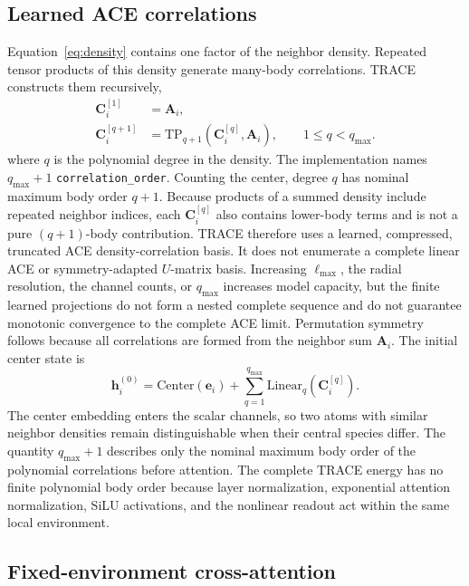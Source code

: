 \documentclass[aps,prx,preprint,notitlepage,superscriptaddress,nofootinbib,floatfix]{revtex4-2}
\newcommand{\vect}[1]{\bm{#1}}
\begin{document}
\subsection{Learned ACE correlations}

Equation~\eqref{eq:density} contains one factor of the
neighbor density. Repeated tensor products of this density generate many-body
correlations. TRACE constructs them recursively,
\begin{align}
 \vect C_i^{[1]} &= \vect A_i,\\
 \vect C_i^{[q+1]} &=
 \mathrm{TP}_{q+1}\!\left(\vect C_i^{[q]},\vect A_i\right),
 \qquad 1\le q<q_{\max}.
 \label{eq:ace-recursion}
\end{align}
where $q$ is the polynomial degree in the density. The
implementation names $q_{\max}+1$ \nolinkurl{correlation_order}. Counting the center, degree $q$ has nominal maximum body order $q+1$. Because products of a summed density include repeated neighbor indices, each
$\vect C_i^{[q]}$ also contains lower-body terms and is not a pure
$(q+1)$-body contribution. TRACE therefore uses a learned, compressed,
truncated ACE density-correlation basis. It does not enumerate a complete
linear ACE or symmetry-adapted $U$-matrix basis. Increasing $\ell_{\max}$, the radial resolution, the channel counts, or $q_{\max}$ increases model capacity, but the finite learned projections do not form a nested complete sequence and do not guarantee monotonic convergence to the complete ACE limit. Permutation symmetry follows because all correlations are formed from the neighbor sum
$\vect A_i$. The initial center state is
\begin{equation}
 \vect h_i^{(0)}=
 \mathrm{Center}(\vect e_i)
 +\sum_{q=1}^{q_{\max}}\mathrm{Linear}_{q}
 \!\left(\vect C_i^{[q]}\right).
 \label{eq:center-state}
\end{equation}
The center embedding enters the scalar channels, so two atoms
with similar neighbor densities remain distinguishable when their central
species differ. The quantity $q_{\max}+1$ describes only the nominal maximum
body order of the polynomial correlations before attention. The complete TRACE
energy has no finite polynomial body order because layer normalization,
exponential attention normalization, SiLU activations, and the nonlinear
readout act within the same local environment.

\subsection{Fixed-environment cross-attention}
\end{document}
